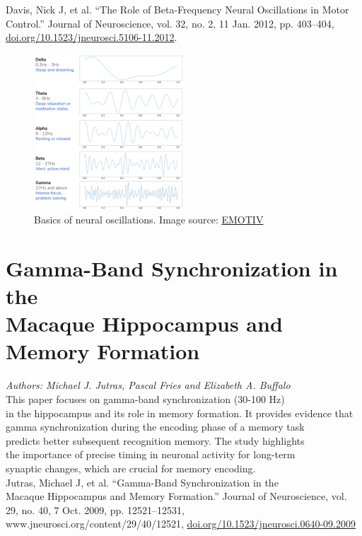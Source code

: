\documentclass[12pt]{article}
\begin{document}
\noindent Davis, Nick J, et al. “The Role of Beta-Frequency Neural Oscillations in Motor Control.” Journal of Neuroscience, vol. 32, no. 2, 11 Jan. 2012, pp. 403–404, \href{https://doi.org/10.1523/jneurosci.5106-11.2012}{doi.org/10.1523/jneurosci.5106-11.2012}.\\

\begin{figure}[ht]
    \centering
    \includegraphics[width=0.5\textwidth]{brain_waves.png} %
    \caption{Basics of neural oscillations. Image source: \href{https://d2z0k1elb7rxgj.cloudfront.net/uploads/2022/09/brain-waves-988x1024.png}{EMOTIV}}
    \label{fig:waves}
\end{figure}

\section{Gamma-Band Synchronization in the\\Macaque Hippocampus and Memory Formation}

\noindent\textit{Authors: Michael J. Jutras, Pascal Fries and Elizabeth A. Buffalo}\\

\noindent This paper focuses on gamma-band synchronization (30-100 Hz)\\in the hippocampus and its role in memory formation. It provides evidence that gamma synchronization during the encoding phase of a memory task\\predicts better subsequent recognition memory. The study highlights\\the importance of precise timing in neuronal activity for long-term\\synaptic changes, which are crucial for memory encoding.\\

Jutras, Michael J, et al. “Gamma-Band Synchronization in the\\Macaque Hippocampus and Memory Formation.” Journal of Neuroscience, vol. 29, no. 40, 7 Oct. 2009, pp. 12521–12531, www.jneurosci.org/content/29/40/12521, \href{https://doi.org/10.1523/jneurosci.0640-09.2009}{doi.org/10.1523/jneurosci.0640-09.2009}\\
\end{document}
